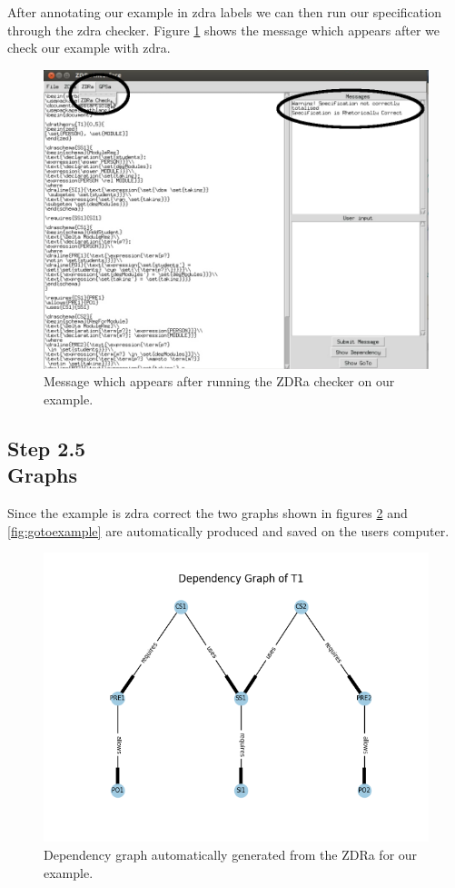 After annotating our example in \gls{zdra} labels we can then run our
specification through the \gls{zdra} checker. Figure \ref{fig:zdracorrect} shows
the message which appears after we check our example with \gls{zdra}.

\begin{figure}[H]
\centering
\includegraphics[scale=0.3]{Figures/fullexample/zdracorrect.png}
\caption{Message which appears after running the ZDRa checker on our example. \label{fig:zdracorrect}}
\end{figure}

\subsection{Step 2.5\\Graphs}

Since the example is \gls{zdra} correct the two graphs shown in figures
\ref{fig:depexample} and \ref{fig:gotoexample} are automatically produced and
saved on the users computer.

\begin{figure}[H]
\centering
\includegraphics[scale=0.7]{Figures/fullexample/dp_fullexample.png}
\caption{Dependency graph automatically generated from the ZDRa for our example. \label{fig:depexample}}
\end{figure}

